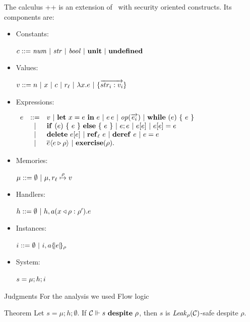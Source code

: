 \documentclass[11pt]{beamer}
\begin{document}
\begin{frame}{The calculus}
\ljs++ is an extension of \ljs\ with security oriented constructs. Its components are:

\begin{itemize}
\item Constants: \begin{tiny}$c ::= \mathit{num} ~|~ \mathit{str} ~|~ \mathit{bool} ~|~ \unit ~|~ \undef$\end{tiny}
\item Values: \begin{tiny}$v ::= n ~|~ x ~|~ c ~|~ r_{\ell} ~|~ \lam{x}{e} ~|~ \rec{\vec{str_i:v_i}}$\end{tiny}
\item Expressions: \begin{tiny}$
\begin{array}{lcl}
e & ::= & v ~|~ \letexpr{x}{e}{e} ~|~ \appl{e}{e} ~|~ \op(\vec{e_i}) ~|~ \while{e}{e} \\
& | & \cond{e}{e}{e} ~|~  e;e ~|~ \lookup{e}{e} ~|~ \store{e}{e}{e} \\
& | & \delete{e}{e} ~|~ \newref{\ell}{e} ~|~ \deref{e} ~|~ \setref{e}{e} \\
& | & \send{e}{e}{\rho} ~|~ \exercise{\rho}.
\end{array}
$\end{tiny}
\item Memories: \begin{tiny}$\mu ::= \emptyset ~|~ \mu, \map{r_{\ell}}{\rho}{v}$\end{tiny}
\item Handlers: \begin{tiny}$h ::= \emptyset ~|~ h,\handler{a}{x}{\rho}{e}{\rho'}$\end{tiny}
\item Instances: \begin{tiny}$i ::= \emptyset ~|~ i,\inst{a}{e}{\rho}$\end{tiny}
\item System: \begin{tiny}$s = \sys{\mu}{h}{i}$\end{tiny}
\end{itemize}
\end{frame}

\begin{frame}{Judgments}
For the analysis we used Flow logic \cite{FlowLogic}
\end{frame}

\begin{frame}{Theorem}
Let $s = \mu;h;\emptyset$. If $\absC \Vdash s \despite \rho$, then $s$ is $\permsleak{\rho}(\absC)$-safe despite $\rho$.
\end{frame}
\end{document}
